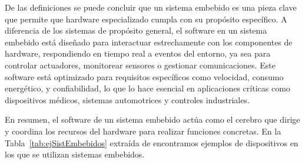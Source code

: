 De las definiciones se puede concluir que un sistema embebido es una pieza clave que permite que hardware especializado cumpla con su propósito específico. A diferencia de los sistemas de propósito general, el software en un sistema embebido está diseñado para interactuar estrechamente con los componentes de hardware, respondiendo en tiempo real a eventos del entorno, ya sea para controlar actuadores, monitorear sensores o gestionar comunicaciones. Este software está optimizado para requisitos específicos como velocidad, consumo energético, y confiabilidad, lo que lo hace esencial en aplicaciones críticas como dispositivos médicos, sistemas automotrices y controles industriales.
	
En resumen, el software de un sistema embebido actúa como el cerebro que dirige y coordina los recursos del hardware para realizar funciones concretas. En la Tabla~\ref{tab:ejSistEmbebidos} extraída de \cite{noergaard2005embedded} encontramos ejemplos de dispositivos en los que se utilizan sistemas embebidos.


